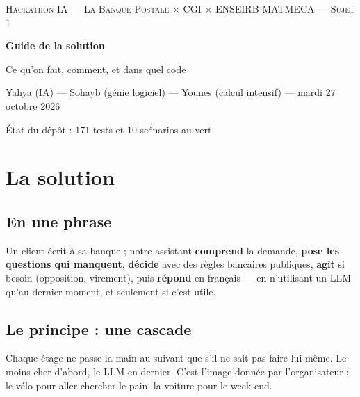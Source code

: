\documentclass[11pt,a4paper]{article}
\begin{document}
\begin{center}
{\small\scshape\color{darkgray} Hackathon IA --- La Banque Postale $\times$ CGI $\times$ ENSEIRB-MATMECA --- Sujet 1\par}
\vspace{0.25cm}
{\LARGE\bfseries\color{mainblue} Guide de la solution\par}
\vspace{0.15cm}
{\large Ce qu'on fait, comment, et dans quel code\par}
\vspace{0.2cm}
{\small Yahya (IA) --- Sohayb (génie logiciel) --- Younes (calcul intensif) --- mardi 27 octobre 2026\par}
{\footnotesize\color{darkgray} État du dépôt : 171 tests et 10 scénarios au vert.\par}
\end{center}

\section{La solution}

\subsection{En une phrase}

Un client écrit à sa banque ; notre assistant \textbf{comprend} la demande, \textbf{pose les
questions qui manquent}, \textbf{décide} avec des règles bancaires publiques, \textbf{agit} si
besoin (opposition, virement), puis \textbf{répond} en français --- en n'utilisant un LLM qu'au
dernier moment, et seulement si c'est utile.

\subsection{Le principe : une cascade}

Chaque étage ne passe la main au suivant que s'il ne sait pas faire lui-même. Le moins cher
d'abord, le LLM en dernier. C'est l'image donnée par l'organisateur : le vélo pour aller chercher
le pain, la voiture pour le week-end.
\end{document}
